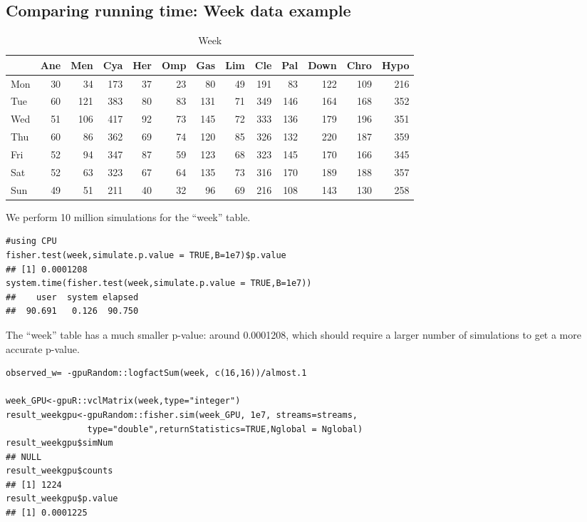 \documentclass[article,nojss]{jss}\usepackage[]{graphicx}\usepackage[]{color}
\makeatletter
\newenvironment{kframe}{%
 \def\at@end@of@kframe{}%
 \ifinner\ifhmode%
  \def\at@end@of@kframe{\end{minipage}}%
  \begin{minipage}{\columnwidth}%
 \fi\fi%
 \def\FrameCommand##1{\hskip\@totalleftmargin \hskip-\fboxsep
 \colorbox{shadecolor}{##1}\hskip-\fboxsep
     \hskip-\linewidth \hskip-\@totalleftmargin \hskip\columnwidth}%
 \MakeFramed {\advance\hsize-\width
   \@totalleftmargin\z@ \linewidth\hsize
   \@setminipage}}%
 {\par\unskip\endMakeFramed%
 \at@end@of@kframe}
\newenvironment{knitrout}{}{} %
\makeatother
\begin{document}
\subsection{Comparing running time: Week data example}


\begin{knitrout}
\color{fgcolor}\begin{table}[H]

\caption{\label{tab:weekdata}Week\label{tab:week}}
\centering
\begin{tabular}[t]{l|r|r|r|r|r|r|r|r|r|r|r|r}
\hline
  & Ane & Men & Cya & Her & Omp & Gas & Lim & Cle & Pal & Down & Chro & Hypo\\
\hline
Mon & 30 & 34 & 173 & 37 & 23 & 80 & 49 & 191 & 83 & 122 & 109 & 216\\
\hline
Tue & 60 & 121 & 383 & 80 & 83 & 131 & 71 & 349 & 146 & 164 & 168 & 352\\
\hline
Wed & 51 & 106 & 417 & 92 & 73 & 145 & 72 & 333 & 136 & 179 & 196 & 351\\
\hline
Thu & 60 & 86 & 362 & 69 & 74 & 120 & 85 & 326 & 132 & 220 & 187 & 359\\
\hline
Fri & 52 & 94 & 347 & 87 & 59 & 123 & 68 & 323 & 145 & 170 & 166 & 345\\
\hline
Sat & 52 & 63 & 323 & 67 & 64 & 135 & 73 & 316 & 170 & 189 & 188 & 357\\
\hline
Sun & 49 & 51 & 211 & 40 & 32 & 96 & 69 & 216 & 108 & 143 & 130 & 258\\
\hline
\end{tabular}
\end{table}

\end{knitrout}
We perform 10 million simulations for the ``week'' table.
\begin{knitrout}
\color{fgcolor}\begin{kframe}
\begin{verbatim}
#using CPU
fisher.test(week,simulate.p.value = TRUE,B=1e7)$p.value
## [1] 0.0001208
system.time(fisher.test(week,simulate.p.value = TRUE,B=1e7))
##    user  system elapsed 
##  90.691   0.126  90.750
\end{verbatim}
\end{kframe}
\end{knitrout}
The ``week'' table has a much smaller p-value: around 0.0001208, which should require a larger number of simulations to get a more accurate p-value.
\begin{knitrout}
\color{fgcolor}\begin{kframe}
\begin{verbatim}
observed_w= -gpuRandom::logfactSum(week, c(16,16))/almost.1

week_GPU<-gpuR::vclMatrix(week,type="integer")
result_weekgpu<-gpuRandom::fisher.sim(week_GPU, 1e7, streams=streams,
                type="double",returnStatistics=TRUE,Nglobal = Nglobal)
result_weekgpu$simNum
## NULL
result_weekgpu$counts
## [1] 1224
result_weekgpu$p.value
## [1] 0.0001225
\end{verbatim}
\end{kframe}
\end{knitrout}
\end{document}
